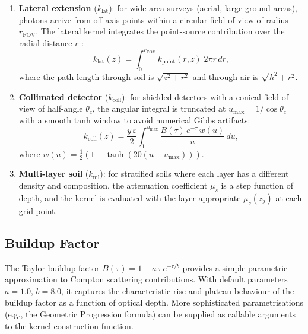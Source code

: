 \documentclass[a4paper,11pt]{article}
\begin{document}
\begin{enumerate}[label=\textbf{K\arabic*:}]
  \item \textbf{Lateral extension} ($k_{\mathrm{lat}}$): for wide-area
  surveys (aerial, large ground areas), photons arrive from off-axis
  points within a circular field of view of radius $r_{\mathrm{FOV}}$.
  The lateral kernel integrates the point-source contribution over the
  radial distance $r$ \citep{tyler2008determination}:
  \begin{equation}
    k_{\mathrm{lat}}(z) = \int_0^{r_{\mathrm{FOV}}} k_{\mathrm{point}}(r, z)\; 2\pi r\, dr,
  \end{equation}
  where the path length through soil is $\sqrt{z^2 + r^2}$ and
  through air is $\sqrt{h^2 + r^2}$.

  \item \textbf{Collimated detector} ($k_{\mathrm{coll}}$): for shielded
detectors with a conical field of view of half-angle $\theta_c$,
  the angular integral is truncated at $u_{\max} = 1/\cos\theta_c$
  with a smooth tanh window to avoid numerical Gibbs artifacts:
  \begin{equation}
    k_{\mathrm{coll}}(z) = \frac{y\,\varepsilon}{2}
      \int_1^{u_{\max}} \frac{B(\tau)\,e^{-\tau}\,w(u)}{u}\, du,
  \end{equation}
  where $w(u) = \tfrac{1}{2}(1 - \tanh(20(u - u_{\max})))$.

  \item \textbf{Multi-layer soil} ($k_{\mathrm{ml}}$): for stratified
  soils where each layer has a different density and composition, the
  attenuation coefficient $\mu_s$ is a step function of depth, and the
  kernel is evaluated with the layer-appropriate $\mu_s(z_j)$ at each
  grid point.
\end{enumerate}

\subsection{Buildup Factor}

The Taylor buildup factor $B(\tau) = 1 + a\,\tau\,e^{-\tau/b}$ provides a
simple parametric approximation to Compton scattering contributions.
With default parameters $a = 1.0$, $b = 8.0$, it captures the
characteristic rise-and-plateau behaviour of the buildup factor as a
function of optical depth.  More sophisticated parametrisations (e.g.,
the Geometric Progression formula) can be supplied as callable arguments
to the kernel construction function.
\end{document}
